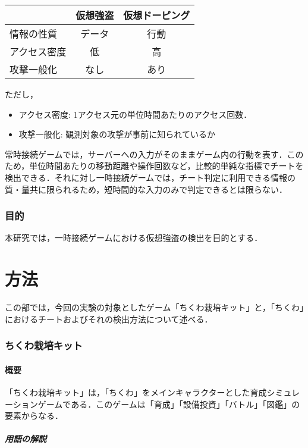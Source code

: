 \documentclass[a4paper,11pt]{jsarticle}
\begin{document}
\begin{center}
\begin{tabular}{l|cc}
& 仮想強盗 & 仮想ドーピング \\ \hline
情報の性質 & データ & 行動 \\
アクセス密度 & 低 & 高 \\
攻撃一般化 & なし & あり \\
\end{tabular}
\end{center}

ただし，

\begin{itemize}
\item
アクセス密度: 1アクセス元の単位時間あたりのアクセス回数．
\item
攻撃一般化: 観測対象の攻撃が事前に知られているか
\end{itemize}

常時接続ゲームでは，サーバーへの入力がそのままゲーム内の行動を表す．このため，単位時間あたりの移動距離や操作回数など，比較的単純な指標でチートを検出できる\cite{botcraft}．それに対し一時接続ゲームでは，チート判定に利用できる情報の質・量共に限られるため，短時間的な入力のみで判定できるとは限らない．

\section{目的}
本研究では，一時接続ゲームにおける仮想強盗の検出を目的とする．

\newpage %
\part{方法}
この部では，今回の実験の対象としたゲーム「ちくわ栽培キット」と，「ちくわ」におけるチートおよびそれの検出方法について述べる．

\section{ちくわ栽培キット}
\subsection{概要}
「ちくわ栽培キット」は，「ちくわ」をメインキャラクターとした育成シミュレーションゲームである．このゲームは「育成」「設備投資」「バトル」「図鑑」の要素からなる．

\subsubsection{用語の解説}
\end{document}
